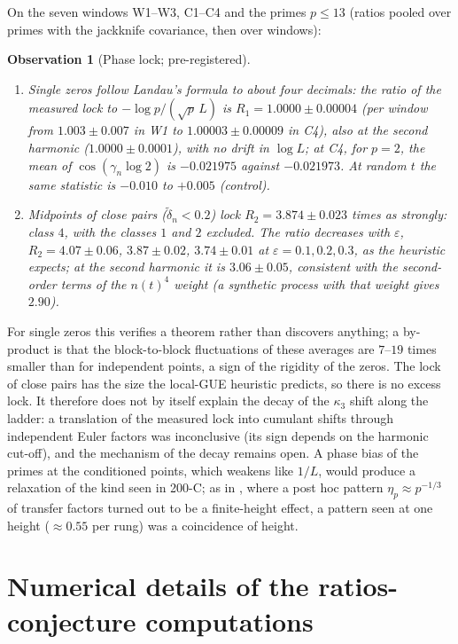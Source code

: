 \documentclass[12pt]{amsart}
\newtheorem{observation}{Observation}
\theoremstyle{remark}
\newcommand{\eps}{\varepsilon}
\newcommand{\1}{\mathbf{1}}
\begin{document}
On the seven windows W1--W3, C1--C4 and the primes $p\le13$ (ratios
pooled over primes with the jackknife covariance, then over windows):
\begin{observation}[Phase lock; pre-registered]\label{obs:phase}
\begin{enumerate}
\item[(1)] Single zeros follow Landau's formula to about four decimals:
the ratio of the measured lock to $-\log p/(\sqrt p\,L)$ is
$R_1=1.0000\pm0.00004$ (per window from $1.003\pm0.007$ in W1 to
$1.00003\pm0.00009$ in C4), also at the second harmonic
($1.0000\pm0.0001$), with no drift in $\log L$; at C4, for $p=2$, the mean
of $\cos(\gamma_n\log2)$ is $-0.021975$ against $-0.021973$. At random $t$
the same statistic is $-0.010$ to $+0.005$ (control).
\item[(2)] Midpoints of close pairs ($\tilde\delta_n<0.2$) lock
$R_2=3.874\pm0.023$ times as strongly: class $4$, with the classes $1$ and
$2$ excluded. The ratio decreases with $\eps$, $R_2=4.07\pm0.06$,
$3.87\pm0.02$, $3.74\pm0.01$ at $\eps=0.1,0.2,0.3$, as the heuristic
expects; at the second harmonic it is $3.06\pm0.05$, consistent with the
second-order terms of the $n(t)^4$ weight (a synthetic process with that
weight gives $2.90$).
\end{enumerate}
\end{observation}

For single zeros this verifies a theorem rather than discovers anything; a
by-product is that the block-to-block fluctuations of these averages are
$7$--$19$ times smaller than for independent points, a sign of the
rigidity of the zeros. The lock of close pairs has the size the local-GUE
heuristic predicts, so there is no excess lock. It therefore does not by
itself explain the decay of the $\kappa_3$ shift along the ladder: a
translation of the measured lock into cumulant shifts through independent
Euler factors was inconclusive (its sign depends on the harmonic
cut-off), and the mechanism of the decay remains open. A phase bias of the
primes at the conditioned points, which weakens like $1/L$, would produce
a relaxation of the kind seen in 200-C; as in \cite{companion7}, where a
post hoc pattern $\eta_p\approx p^{-1/3}$ of transfer factors turned out to
be a finite-height effect, a pattern seen at one height ($\approx0.55$ per
rung) was a coincidence of height.

\section{Numerical details of the ratios-conjecture computations}\label{sec:numsupp}
\end{document}
